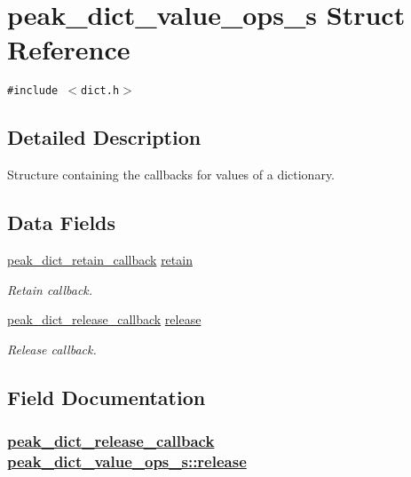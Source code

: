 \hypertarget{structpeak__dict__value__ops__s}{
\section{peak\_\-dict\_\-value\_\-ops\_\-s Struct Reference}
\label{structpeak__dict__value__ops__s}
}
{\tt \#include $<$dict.h$>$}



\subsection{Detailed Description}
Structure containing the callbacks for values of a dictionary. 

\subsection*{Data Fields}
\begin{CompactItemize}
\item 
\hyperlink{group__dict_ga1}{peak\_\-dict\_\-retain\_\-callback} \hyperlink{structpeak__dict__value__ops__s_o0}{retain}
\begin{CompactList}\small\item\em Retain callback. \item\end{CompactList}\item 
\hyperlink{group__dict_ga2}{peak\_\-dict\_\-release\_\-callback} \hyperlink{structpeak__dict__value__ops__s_o1}{release}
\begin{CompactList}\small\item\em Release callback. \item\end{CompactList}\end{CompactItemize}


\subsection{Field Documentation}
\hypertarget{structpeak__dict__value__ops__s_o1}{
\subsubsection[release]{\setlength{\rightskip}{0pt plus 5cm}\hyperlink{group__dict_ga2}{peak\_\-dict\_\-release\_\-callback} \hyperlink{structpeak__dict__value__ops__s_o1}{peak\_\-dict\_\-value\_\-ops\_\-s::release}}}
\label{structpeak__dict__value__ops__s_o1}


